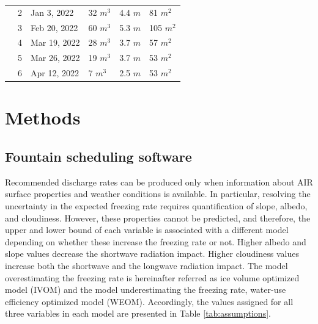 \documentclass[tc, manuscript]{copernicus}
\begin{document}
\begin{table}
\begin{tabular}{@{}|llllll|@{}}
		\multicolumn{1}{|l|}{} & 2            & Jan 3, 2022   & 32 $m^{3}$      & 4.4 $m$
		                       & 81 $m^{2}$                                                                       \\
		\multicolumn{1}{|l|}{} & 3            & Feb 20, 2022   & 60 $m^{3}$      & 5.3 $m$
		                       & 105 $m^{2}$                                                                       \\
		\multicolumn{1}{|l|}{} & 4            & Mar 19, 2022   & 28 $m^{3}$      & 3.7 $m$
		                       & 57 $m^{2}$                                                                       \\
		\multicolumn{1}{|l|}{} & 5            & Mar 26, 2022   & 19 $m^{3}$      & 3.7 $m$
		                       & 53 $m^{2}$                                                                       \\
		\multicolumn{1}{|l|}{} & 6            & Apr 12, 2022   & 7 $m^{3}$      & 2.5 $m$
		                       & 53 $m^{2}$                                                                       \\
		\bottomrule
	\end{tabular}

\end{table}

\section{Methods}

\subsection{Fountain scheduling software}

Recommended discharge rates can be produced only when information about AIR surface properties and weather
conditions is available. In particular, resolving the uncertainty in the expected freezing rate requires
quantification of slope, albedo, and cloudiness. However, these properties cannot be predicted, and therefore,
the upper and lower bound of each variable is associated with a different model depending on whether these
increase the freezing rate or not. Higher albedo and slope values decrease the shortwave radiation impact.
Higher cloudiness values increase both the shortwave and the longwave radiation impact. The model overestimating
the freezing rate is hereinafter referred as ice volume optimized model (IVOM) and the model underestimating the
freezing rate, water-use efficiency optimized model (WEOM). Accordingly, the values assigned for all three
variables in each model are presented in Table \ref{tab:assumptions}.
\end{document}
